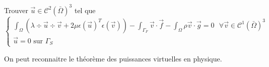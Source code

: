 Trouver $\vec{u} \in \mathcal{C}^2(\bar{\Omega})^3$ tel que
\begin{equation}\label{varia}
    \begin{cases}
        \displaystyle\int_{\Omega} (\lambda \div \vec{u} \div \vec{v} + 2\mu \epsilon(\vec{u})^T \epsilon(\vec{v})) - \int_{\Gamma_F} \vec{v} \cdot \vec{f} - \int_\Omega \rho \vec{v} \cdot \vec{g} = 0 \textrm{ } \forall \vec{v} \in \mathcal{C}^1(\bar{\Omega})^3\\
        \vec{u} = 0 \textrm{ sur } \Gamma_S
    \end{cases}
\end{equation}

On peut reconnaitre le théorème des puissances virtuelles en physique.
